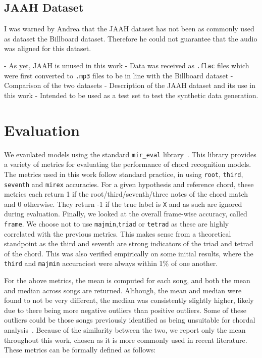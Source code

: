 \subsection{JAAH Dataset}
I was warned by Andrea that the JAAH dataset has not been as commonly used as dataset the Billboard dataset. Therefore he could not guarantee that the audio was aligned for this dataset.

- As yet, JAAH is unused in this work
- Data was received as \texttt{.flac} files which were first converted to \texttt{.mp3} files to be in line with the Billboard dataset
- Comparison of the two datasets
- Description of the JAAH dataset and its use in this work
- Intended to be used as a test set to test the synthetic data generation.

\section{Evaluation}

We evaulated models using the standard \texttt{mir\_eval} library~\citep{mir_eval}. This library provides a variety of metrics for evaluating the performance of chord recognition models. The metrics used in this work follow standard practice, in using \texttt{root}, \texttt{third}, \texttt{seventh} and \texttt{mirex} accuracies. For a given hypothesis and reference chord, these metrics each return 1 if the root/third/seventh/three notes of the chord match and 0 otherwise. They return -1 if the true label is \texttt{X} and as such are ignored during evaluation. Finally, we looked at the overall frame-wise accuracy, called \texttt{frame}. We choose not to use \texttt{majmin},\texttt{triad} or \texttt{tetrad} as these are highly correlated with the previous metrics. This makes sense from a theoretical standpoint as the third and seventh are strong indicators of the triad and tetrad of the chord. This was also verified empirically on some initial results, where the \texttt{third} and \texttt{majmin} accuraciest were always within 1\% of one another.

For the above metrics, the mean is computed for each song, and both the mean and median across songs are returned. Although, the mean and median were found to not be very different, the median was consistently slightly higher, likely due to there being more negative outliers than positive outliers. Some of these outliers could be those songs previously identified as being unsuitable for chordal analysis~\citep{FourTimelyInsights}. Because of the similarity between the two, we report only the mean throughout this work, chosen as it is more commonly used in recent literature. These metrics can be formally defined as follows:

